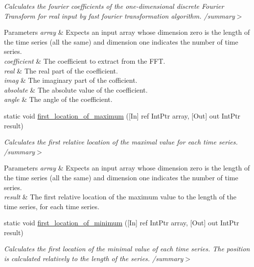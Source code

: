 \begin{DoxyCompactItemize}
\begin{DoxyCompactList}\small\item\em Calculates the fourier coefficients of the one-\/dimensional discrete Fourier Transform for real input by fast fourier transformation algorithm. /summary$>$ 
\begin{DoxyParams}{Parameters}
{\em array} & Expects an input array whose dimension zero is the length of the time series (all the same) and dimension one indicates the number of time series.\\
\hline
{\em coefficient} & The coefficient to extract from the F\+FT.\\
\hline
{\em real} & The real part of the coefficient.\\
\hline
{\em imag} & The imaginary part of the cofficient.\\
\hline
{\em absolute} & The absolute value of the coefficient.\\
\hline
{\em angle} & The angle of the coefficient.\\
\hline
\end{DoxyParams}
\end{DoxyCompactList}\item 
static void \mbox{\hyperlink{classkhiva_1_1interop_1_1_d_l_l_features_ae70db85ecb8283db50c8b4b2bedc1af1}{first\+\_\+location\+\_\+of\+\_\+maximum}} (\mbox{[}In\mbox{]} ref Int\+Ptr array, \mbox{[}Out\mbox{]} out Int\+Ptr result)
\begin{DoxyCompactList}\small\item\em Calculates the first relative location of the maximal value for each time series. /summary$>$ 
\begin{DoxyParams}{Parameters}
{\em array} & Expects an input array whose dimension zero is the length of the time series (all the same) and dimension one indicates the number of time series.\\
\hline
{\em result} & The first relative location of the maximum value to the length of the time series, for each time series.\\
\hline
\end{DoxyParams}
\end{DoxyCompactList}\item 
static void \mbox{\hyperlink{classkhiva_1_1interop_1_1_d_l_l_features_a6d193c97885c6df4215c9d6802b83625}{first\+\_\+location\+\_\+of\+\_\+minimum}} (\mbox{[}In\mbox{]} ref Int\+Ptr array, \mbox{[}Out\mbox{]} out Int\+Ptr result)
\begin{DoxyCompactList}\small\item\em Calculates the first location of the minimal value of each time series. The position is calculated relatively to the length of the series. /summary$>$ 

\end{DoxyCompactList}
\end{DoxyCompactItemize}

